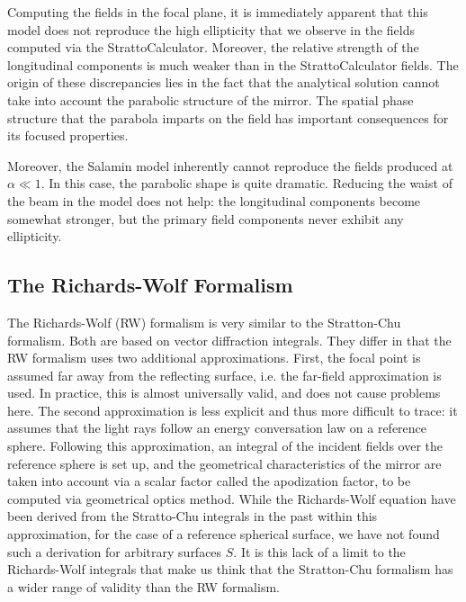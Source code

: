 \documentclass[11pt,SymmetricalJury]{inrsthesis/inrsthesis}
\begin{document}
Computing the fields in the focal plane, it is immediately apparent that this
model does not reproduce the high ellipticity that we observe in the fields
computed via the StrattoCalculator. Moreover, the relative strength of the
longitudinal components is much weaker than in the StrattoCalculator fields. The
origin of these discrepancies lies in the fact that the analytical solution
cannot take into account the parabolic structure of the mirror. The spatial
phase structure that the parabola imparts on the field has important
consequences for its focused properties.

Moreover, the Salamin model inherently cannot reproduce the fields produced at
$\alpha\ll1$. In this case, the parabolic shape is quite dramatic. Reducing the
waist of the beam in the model does not help: the longitudinal components become
somewhat stronger, but the primary field components never exhibit any
ellipticity.


\subsection{The Richards-Wolf Formalism}

The Richards-Wolf (RW) formalism is very similar to the Stratton-Chu formalism.
Both are based on vector diffraction integrals. They differ in that the RW
formalism uses two additional approximations. First, the focal point is assumed
far away from the reflecting surface, i.e. the far-field approximation is used.
In practice, this is almost universally valid, and does not cause problems here.
The second approximation is less explicit and thus more difficult to trace: it
assumes that the light rays follow an energy conversation law on a reference
sphere. Following this approximation, an integral of the incident fields over
the reference sphere is set up, and the geometrical characteristics of the
mirror are taken into account via a scalar factor called the apodization factor,
to be computed via geometrical optics method. While the Richards-Wolf equation
have been derived from the Stratto-Chu integrals in the past \cite{Sheppard1977}
within this approximation, for the case of a reference spherical surface, we
have not found such a derivation for arbitrary surfaces $S$. It is this lack of
a limit to the Richards-Wolf integrals that make us think that the Stratton-Chu
formalism has a wider range of validity than the RW formalism.
\end{document}
